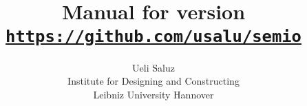 \documentclass[a4paper]{ltxdoc}
\begin{document}
\title{\bfseries \semioname\ \\
	\large Manual for version \semioversion\\[1mm]
	\large\href{https://github.com/usalu/semio}{\texttt{https://github.com/usalu/semio}}}
\author{Ueli Saluz\\
	\normalsize Institute for Designing and Constructing\\[-1mm]
	\normalsize Leibniz University Hannover}

\maketitle
\label{table-of-contents}

\tableofcontents

\clearpage





\end{document}
